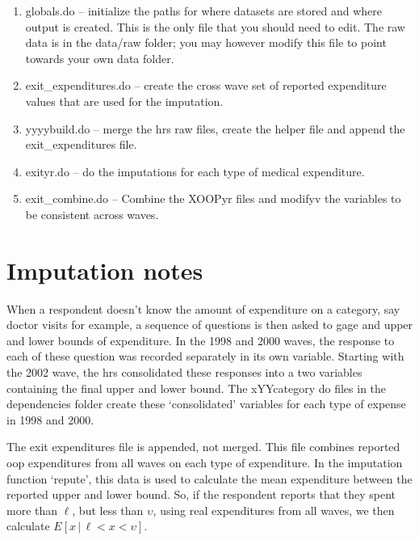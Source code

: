 \documentclass[12pt]{article}
\begin{document}
	\begin{enumerate}
		\item globals.do -- initialize the paths for where datasets are stored and where output is created. This is the only file that you should need to edit. The raw data is in the data/raw folder; you may however modify this file to point towards your own data folder. 
		\item exit\_expenditures.do -- create the cross wave set of reported expenditure values that are used for the imputation. 
		\item yyyybuild.do -- merge the \gls{hrs} raw files, create the helper file and append the exit\_expenditures file.
		\item exityr.do -- do the imputations for each type of medical expenditure.
		\item exit\_combine.do -- Combine the XOOPyr files and modifyv the variables to be consistent across waves.
	\end{enumerate}
	
	\section{Imputation notes}
	
	When a respondent doesn't know the amount of expenditure on a category, say doctor visits for example, a sequence of questions is then asked to gage and upper and lower bounds of expenditure. In the 1998 and 2000 waves, the response to each of these question was recorded separately in its own variable. Starting with the 2002 wave, the \gls{hrs} consolidated these responses into a two variables containing the final upper and lower bound. The xYYcategory do files in the dependencies folder create these `consolidated' variables for each type of expense in 1998 and 2000.
	
	The exit expenditures file is appended, not merged. This file combines reported \gls{oop} expenditures from all waves on each type of expenditure. In the imputation function `repute', this data is used to calculate the mean expenditure between the reported upper and lower bound. So, if the respondent reports that they spent more than $\ell$, but less than $\upsilon$, using real expenditures from all waves, we then calculate $E[x \, | \, \ell < x < \upsilon]$.
	
	
\end{document}
